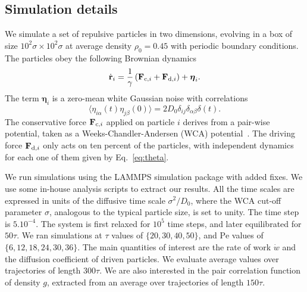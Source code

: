 \documentclass[pre, superscriptaddress, twocolumn,pre]{revtex4-1}
\begin{document}


\subsection{Simulation details}

We simulate a set of repulsive particles in two dimensions, evolving in a box  of size $10^2\sigma\times 10^2\sigma$ at average density $\rho_0=0.45$ with periodic boundary conditions. The particles obey the following Brownian dynamics
\begin{equation}\label{eq:xEOM}
	\dot{\bf r}_i = \frac{1}{\gamma} \left({\bf F}_{{\rm c},i} + {\bf F}_{{\rm d},i}\right) + {\boldsymbol\eta}_i .
\end{equation}
The term ${\boldsymbol\eta}_i$ is a zero-mean white Gaussian noise with correlations
\begin{equation}
	\langle \eta_{i\alpha}(t)\eta_{j\beta}(0)\rangle = 2D_0\delta_{ij}\delta_{\alpha\beta}\delta(t) .
\end{equation}
The conservative force ${\bf F}_{{\rm c},i}$ applied on particle $i$ derives from a pair-wise potential, taken as a Weeks-Chandler-Andersen (WCA) potential~\cite{WCA1971}. The driving force ${\bf F}_{{\rm d},i}$ only acts on ten percent of the particles, with independent dynamics for each one of them given by Eq.~\eqref{eq:theta}. 


We run simulations using the LAMMPS simulation package with added fixes. We use some in-house analysis scripts to extract our results. All the time scales are expressed in units of the diffusive time scale $\sigma^2/D_0$, where the WCA cut-off parameter $\sigma$, analogous to the typical particle size, is set to unity. The time step is $5.10^{-4}$. The system is first relaxed for $10^5$ time steps, and later equilibrated for $50\tau$. We ran simulations at $\tau$ values of $\{20,30,40,50\}$, and $\text{Pe}$ values of $\{6,12,18,24,30,36\}$. The main quantities of interest are the rate of work $\dot w$ and the diffusion coefficient of driven particles. We evaluate average values over trajectories of length $300\tau$. We are also interested in the pair correlation function of density $g$, extracted from an average over trajectories of length $150 \tau$. 
\end{document}
